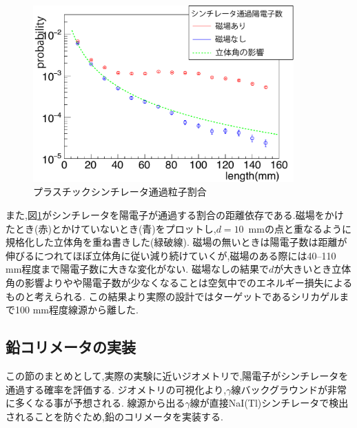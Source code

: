 \begin{figure}[!tbp]
	\centering
		\includegraphics[width=10cm]{fig/scinti_test.pdf}
	\caption{プラスチックシンチレータ通過粒子割合}
	\label{scinti_test}
\end{figure}


また,図\ref{scinti_test}がシンチレータを陽電子が通過する割合の距離依存である.磁場をかけたとき(赤)とかけていないとき(青)をプロットし,$d=10$\, mmの点と重なるように規格化した立体角を重ね書きした(緑破線).
磁場の無いときは陽電子数は距離が伸びるにつれてほぼ立体角に従い減り続けていくが,磁場のある際には40--110 mm程度まで陽電子数に大きな変化がない.
磁場なしの結果で$d$が大きいとき立体角の影響よりやや陽電子数が少なくなることは空気中でのエネルギー損失によるものと考えられる.
この結果より実際の設計ではターゲットであるシリカゲルまで100 mm程度線源から離した.

\subsection{鉛コリメータの実装}
この節のまとめとして,実際の実験に近いジオメトリで,陽電子がシンチレータを通過する確率を評価する.
ジオメトリの可視化より,$\gamma$線バックグラウンドが非常に多くなる事が予想される.
線源から出る$\gamma$線が直接NaI(Tl)シンチレータで検出されることを防ぐため,鉛のコリメータを実装する.

